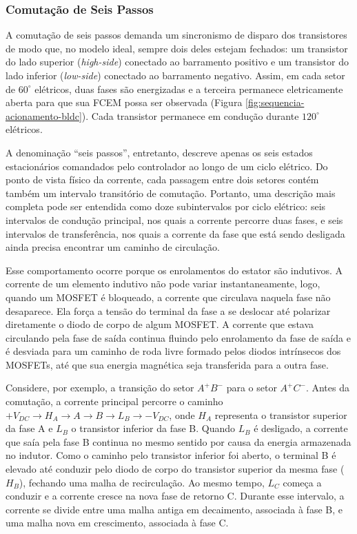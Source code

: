  \subsubsection{Comutação de Seis Passos} 

 A comutação de seis passos demanda um sincronismo de disparo dos transistores de modo que, no modelo ideal, sempre dois deles estejam fechados: um transistor do lado superior (\textit{high-side}) conectado ao barramento positivo e um transistor do lado inferior (\textit{low-side}) conectado ao barramento negativo. Assim, em cada setor de $60^\circ$ elétricos, duas fases são energizadas e a terceira permanece eletricamente aberta para que sua FCEM possa ser observada (Figura \ref{fig:sequencia-acionamento-bldc}). Cada transistor permanece em condução durante $120^\circ$ elétricos.

 A denominação ``seis passos'', entretanto, descreve apenas os seis estados estacionários comandados pelo controlador ao longo de um ciclo elétrico. Do ponto de vista físico da corrente, cada passagem entre dois setores contém também um intervalo transitório de comutação. Portanto, uma descrição mais completa pode ser entendida como doze subintervalos por ciclo elétrico: seis intervalos de condução principal, nos quais a corrente percorre duas fases, e seis intervalos de transferência, nos quais a corrente da fase que está sendo desligada ainda precisa encontrar um caminho de circulação.

 Esse comportamento ocorre porque os enrolamentos do estator são indutivos. A corrente de um elemento indutivo não pode variar instantaneamente, logo, quando um MOSFET é bloqueado, a corrente que circulava naquela fase não desaparece. Ela força a tensão do terminal da fase a se deslocar até polarizar diretamente o diodo de corpo de algum MOSFET. A corrente que estava circulando pela fase de saída continua fluindo pelo enrolamento da fase de saída e é desviada para um caminho de roda livre formado pelos diodos intrínsecos dos MOSFETs, até que sua energia magnética seja transferida para a outra fase.

 Considere, por exemplo, a transição do setor $A^+B^-$ para o setor $A^+C^-$. Antes da comutação, a corrente principal percorre o caminho $+V_{DC} \rightarrow H_A \rightarrow A \rightarrow B \rightarrow L_B \rightarrow -V_{DC}$, onde $H_A$ representa o transistor superior da fase A e $L_B$ o transistor inferior da fase B. Quando $L_B$ é desligado, a corrente que saía pela fase B continua no mesmo sentido por causa da energia armazenada no indutor. Como o caminho pelo transistor inferior foi aberto, o terminal B é elevado até conduzir pelo diodo de corpo do transistor superior da mesma fase ($H_B$), fechando uma malha de recirculação. Ao mesmo tempo, $L_C$ começa a conduzir e a corrente cresce na nova fase de retorno C. Durante esse intervalo, a corrente se divide entre uma malha antiga em decaimento, associada à fase B, e uma malha nova em crescimento, associada à fase C.

